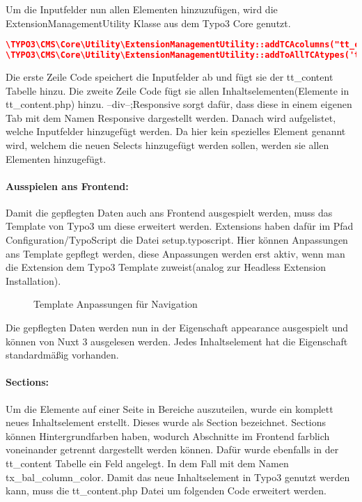 Um die Inputfelder nun allen Elementen hinzuzufügen, wird die ExtensionManagementUtility Klasse aus dem Typo3 Core genutzt.
\begin{lstlisting}[language=json,firstnumber=1]
\TYPO3\CMS\Core\Utility\ExtensionManagementUtility::addTCAcolumns("tt_content",$tempColumns,1);
\TYPO3\CMS\Core\Utility\ExtensionManagementUtility::addToAllTCAtypes('tt_content','--div--;Responsive,tx_responsive_mobile,tx_responsive_tablet,tx_responsive_desktop','');
\end{lstlisting}

Die erste Zeile Code speichert die Inputfelder ab und fügt sie der tt\_content Tabelle hinzu. Die zweite Zeile Code fügt sie allen Inhaltselementen(Elemente in tt\_content.php) hinzu. --div--;Responsive sorgt dafür, dass diese in einem eigenen Tab mit dem Namen Responsive dargestellt werden. Danach wird aufgelistet, welche Inputfelder hinzugefügt werden. Da hier kein spezielles Element genannt wird, welchem die neuen Selects hinzugefügt werden sollen, werden sie allen Elementen hinzugefügt.

\paragraph{Ausspielen ans Frontend:}

Damit die gepflegten Daten auch ans Frontend ausgespielt werden, muss das Template von Typo3 um diese erweitert werden. Extensions haben dafür im Pfad Configuration/TypoScript die Datei setup.typoscript. Hier können Anpassungen ans Template gepflegt werden, diese Anpassungen werden erst aktiv, wenn man die Extension dem Typo3 Template zuweist(analog zur Headless Extension Installation).

\begin{figure}[htb]
\centering
{}
\caption{Template Anpassungen für Navigation}
\label{fig:Template Anpassungen für Navigation}
\end{figure}

Die gepflegten Daten werden nun in der Eigenschaft appearance ausgespielt und können von Nuxt 3 ausgelesen werden. Jedes Inhaltselement hat die Eigenschaft standardmäßig vorhanden.

\paragraph{Sections:}
Um die Elemente auf einer Seite in Bereiche auszuteilen, wurde ein komplett neues Inhaltselement erstellt. Dieses wurde als Section bezeichnet. Sections können Hintergrundfarben haben, wodurch Abschnitte im Frontend farblich voneinander getrennt dargestellt werden können. Dafür wurde ebenfalls in der tt\_content Tabelle ein Feld angelegt. In dem Fall mit dem Namen tx\_bal\_column\_color. Damit das neue Inhaltselement in Typo3 genutzt werden kann, muss die tt\_content.php Datei um folgenden Code erweitert werden. 

